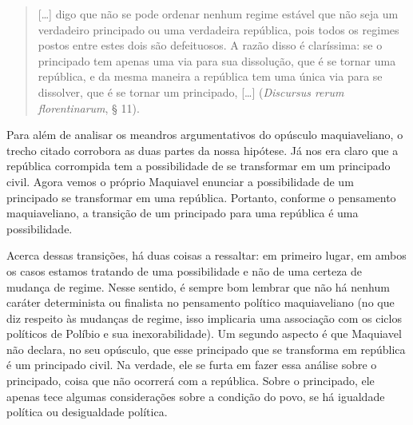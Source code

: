 \begin{quote}
{[}\ldots{}{]} digo que não se pode ordenar nenhum regime estável que não
seja um verdadeiro principado ou uma verdadeira república, pois todos os
regimes postos entre estes dois são defeituosos. A razão disso é
claríssima: se o principado tem apenas uma via para sua dissolução, que
é se tornar uma república, e da mesma maneira a república tem uma única
via para se dissolver, que é se tornar um principado, {[}\ldots{}{]}
(\emph{Discursus rerum florentinarum}, § 11).
\end{quote}

Para além de analisar os meandros argumentativos do opúsculo
maquiaveliano, o trecho citado corrobora as duas partes da nossa
hipótese. Já nos era claro que a república corrompida tem a
possibilidade de se transformar em um principado civil. Agora vemos o
próprio Maquiavel enunciar a possibilidade de um principado se
transformar em uma república. Portanto, conforme o pensamento
maquiaveliano, a transição de um principado para uma república é uma
possibilidade.

Acerca dessas transições, há duas coisas a ressaltar: em primeiro lugar,
em ambos os casos estamos tratando de uma possibilidade e não de uma
certeza de mudança de regime. Nesse sentido, é sempre bom lembrar que
não há nenhum caráter determinista ou finalista no pensamento político
maquiaveliano (no que diz respeito às mudanças de regime, isso
implicaria uma associação com os ciclos políticos de Políbio e sua
inexorabilidade). Um segundo aspecto é que Maquiavel não declara, no seu
opúsculo, que esse principado que se transforma em república é um
principado civil. Na verdade, ele se furta em fazer essa análise sobre o
principado, coisa que não ocorrerá com a república. Sobre o principado,
ele apenas tece algumas considerações sobre a condição do povo, se há
igualdade política ou desigualdade política.


